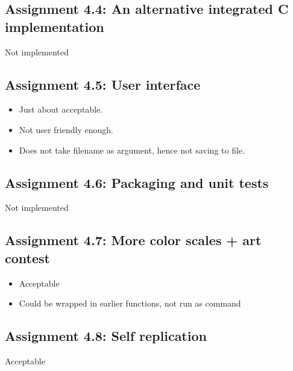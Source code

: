 \documentclass[a4paper]{article}
\begin{document}
\subsection*{Assignment 4.4:  An alternative integrated C implementation}
Not implemented

\subsection*{Assignment 4.5: User interface}
\begin{itemize}
\item Just about acceptable.
\item Not user friendly enough.  
\item Does not take filename as argument, hence not saving to file. 
\end{itemize}


\subsection*{Assignment 4.6:  Packaging and unit tests}
Not implemented 

\subsection*{Assignment 4.7: More color scales + art contest}
\begin{itemize}
\item Acceptable
\item Could be wrapped in earlier functions, not run as command
\end{itemize}
\subsection*{Assignment 4.8: Self replication}
Acceptable



\end{document}
